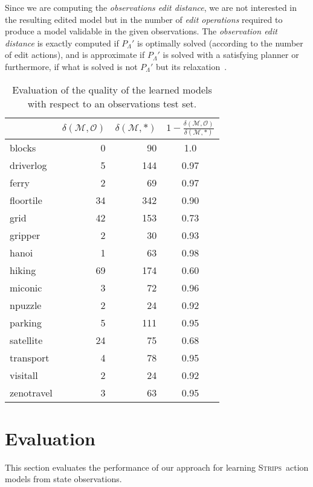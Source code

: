 \documentclass{article}
\newcommand{\strips}{\textsc{Strips}}     %
\begin{document}
Since we are computing the {\em observations edit distance}, we are not interested in the resulting edited model but in the number of {\em edit operations} required to produce a model validable in the given observations. The {\em observation edit distance} is exactly computed if $P_{\Lambda}'$ is optimally solved (according to the number of edit actions), and is approximate if $P_{\Lambda}'$ is solved with a satisfying planner or furthermore, if what is solved is not $P_{\Lambda}'$ but its relaxation~\cite{bonet2001planning}.


\begin{table}
		\begin{center}
                \begin{footnotesize}
			\begin{tabular}{l|r|r|c|}
				& $\delta(\mathcal{M},\mathcal{O})$ & $\delta(\mathcal{M},*)$ & $1-\frac{\delta(\mathcal{M},\mathcal{O})}{\delta(\mathcal{M},*)}$ \\
				\hline
				blocks & 0 & 90 & 1.0 \\
				driverlog & 5 & 144 & 0.97 \\
				ferry & 2 & 69 & 0.97 \\
				floortile & 34 & 342 & 0.90 \\
				grid & 42 & 153 & 0.73 \\
				gripper & 2 & 30 & 0.93 \\
				hanoi & 1 & 63 & 0.98 \\
				hiking & 69 & 174 & 0.60 \\
				miconic & 3 & 72 & 0.96 \\
				npuzzle & 2 & 24 & 0.92 \\
				parking & 5 & 111 & 0.95 \\
				satellite & 24 & 75 & 0.68 \\
				transport & 4 & 78 & 0.95 \\
				visitall & 2 & 24 & 0.92 \\
				zenotravel & 3 & 63 & 0.95
			\end{tabular}
                        	\end{footnotesize}
		\end{center}
	\caption{\small Evaluation of the quality of the learned models with respect to an observations test set.}
	\label{fig:observationstest}
\end{table}

\section{Evaluation}
This section evaluates the performance of our approach for learning \strips\ action models from state observations.
\end{document}
